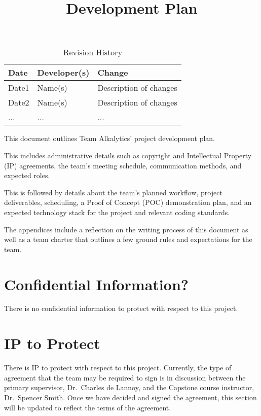 \documentclass{article}
\title{Development Plan\\\progname}
\author{\authname}
\date{}
\begin{document}
\maketitle

\begin{table}[hp]
\caption{Revision History} \label{TblRevisionHistory}
\begin{tabularx}{\textwidth}{llX}
\toprule
\textbf{Date} & \textbf{Developer(s)} & \textbf{Change}\\
\midrule
Date1 & Name(s) & Description of changes\\
Date2 & Name(s) & Description of changes\\
... & ... & ...\\
\bottomrule
\end{tabularx}
\end{table}

\newpage{}

This document outlines Team Alkalytics' project development plan.

This includes administrative details such as copyright and Intellectual
Property (IP) agreements, the team's meeting schedule, communication methods,
and expected roles.

This is followed by details about the team's planned workflow, project
deliverables, scheduling, a Proof of Concept (POC) demonstration plan, and an
expected technology stack for the project and relevant coding standards.

The appendices include a reflection on the writing process of this document as
well as a team charter that outlines a few ground rules and expectations for 
the team.

\section{Confidential Information?}

There is no confidential information to protect with respect to this project.

\section{IP to Protect}

There is IP to protect with respect to this project. Currently, the type of
agreement that the team may be required to sign is in discussion between the
primary supervisor, Dr.\ Charles de Lannoy, and the Capstone course instructor,
Dr.\ Spencer Smith. Once we have decided and signed the agreement, this section
will be updated to reflect the terms of the agreement.
\end{document}
